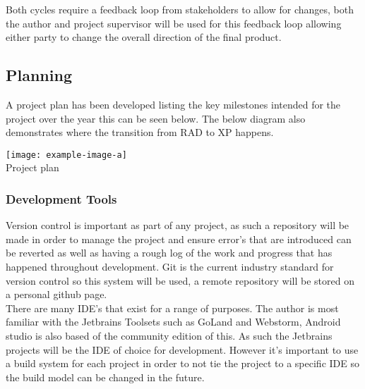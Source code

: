 Both cycles require a feedback loop from stakeholders to allow for changes, both the author and project supervisor will be used for this feedback loop allowing either party to change the overall direction of the final product.

\subsection{Planning}
A project plan has been developed listing the key milestones intended for the project over the year this can be seen below. The below diagram also demonstrates where the transition from RAD to XP happens.

\begin{center}
	\texttt{[image: example-image-a]}\\
	Project plan
\end{center}

\subsubsection{Development Tools}
Version control is important as part of any project, as such a repository will be made in order to manage the project and ensure error's that are introduced can be reverted as well as having a rough log of the work and progress that has happened throughout development. Git is the current industry standard for version control so this system will be used, a remote repository will be stored on a personal github page.\\

There are many IDE's that exist for a range of purposes. The author is most familiar with the Jetbrains Toolsets such as GoLand and Webstorm, Android studio is also based of the community edition of this. As such the Jetbrains projects will be the IDE of choice for development. However it's important to use a build system for each project in order to not tie the project to a specific IDE so the build model can be changed in the future.


